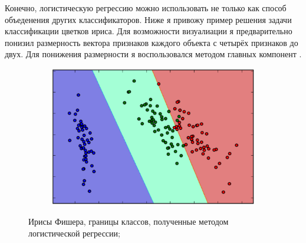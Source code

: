Конечно, логистическую регрессию можно использовать не только как способ объеденения других классификаторов. Ниже я привожу пример решения задачи классификации цветков ириса. Для возможности визуалиации  я предварительно понизил размерность вектора признаков каждого объекта с четырёх признаков до двух. Для понижения размерности я воспользовался методом главных компонент \cite{pca_book}\cite{pca_program}.

\begin{figure}[ht]
	\centering
    \begin{subfigure}[b]{1\textwidth}
    \centering
        \includegraphics[scale=0.5]{pasted-image-19.png}        
    \end{subfigure}
 
    \caption{Ирисы Фишера, границы классов, полученные методом логистической регрессии;}
    \label{fig_parsetree}
\end{figure}
